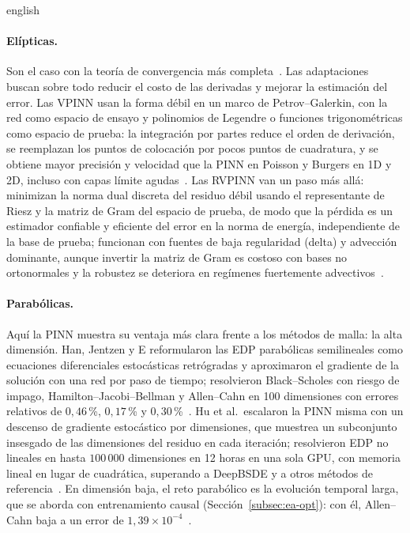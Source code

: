 \documentclass[0000.tex]{subfiles}
\begin{document}
\begin{hyphenrules}{english}
\paragraph{Elípticas.} Son el caso con la teoría de convergencia más completa~\cite{shin2020convergence,doumeche2025convergence}. Las adaptaciones buscan sobre todo reducir el costo de las derivadas y mejorar la estimación del error. Las VPINN usan la forma débil en un marco de Petrov--Galerkin, con la red como espacio de ensayo y polinomios de Legendre o funciones trigonométricas como espacio de prueba: la integración por partes reduce el orden de derivación, se reemplazan los puntos de colocación por pocos puntos de cuadratura, y se obtiene mayor precisión y velocidad que la PINN en Poisson y Burgers en 1D y 2D, incluso con capas límite agudas~\cite{kharazmi2019vpinns}. Las RVPINN van un paso más allá: minimizan la norma dual discreta del residuo débil usando el representante de Riesz y la matriz de Gram del espacio de prueba, de modo que la pérdida es un estimador confiable y eficiente del error en la norma de energía, independiente de la base de prueba; funcionan con fuentes de baja regularidad (delta) y advección dominante, aunque invertir la matriz de Gram es costoso con bases no ortonormales y la robustez se deteriora en regímenes fuertemente advectivos~\cite{rojas2024robust}.

\paragraph{Parabólicas.} Aquí la PINN muestra su ventaja más clara frente a los métodos de malla: la alta dimensión. Han, Jentzen y E reformularon las EDP parabólicas semilineales como ecuaciones diferenciales estocásticas retrógradas y aproximaron el gradiente de la solución con una red por paso de tiempo; resolvieron Black--Scholes con riesgo de impago, Hamilton--Jacobi--Bellman y Allen--Cahn en 100 dimensiones con errores relativos de $0{,}46$\,\%, $0{,}17$\,\% y $0{,}30$\,\%~\cite{han2018solving}. Hu et al.\ escalaron la PINN misma con un descenso de gradiente estocástico por dimensiones, que muestrea un subconjunto insesgado de las dimensiones del residuo en cada iteración; resolvieron EDP no lineales en hasta $100\,000$ dimensiones en 12 horas en una sola GPU, con memoria lineal en lugar de cuadrática, superando a DeepBSDE y a otros métodos de referencia~\cite{hu2024tackling}. En dimensión baja, el reto parabólico es la evolución temporal larga, que se aborda con entrenamiento causal (Sección~\ref{subsec:ea-opt}): con él, Allen--Cahn baja a un error de $1{,}39\times10^{-4}$~\cite{wang2022respecting}.


\end{hyphenrules}
\end{document}
